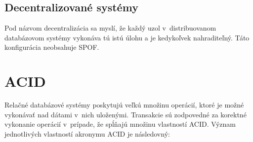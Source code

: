 \documentclass[11pt,twoside,a4paper]{book}
\begin{document}
\subsection*{Decentralizované systémy}

Pod názvom decentralizácia sa myslí, že každý uzol v~distribuovanom databázovom systémy vykonáva tú istú úlohu a je kedykoľvek nahraditeľný. Táto konfigurácia neobsahuje SPOF.


\section{ACID}

Relačné databázové systémy poskytujú veľkú množinu operácií, ktoré je možné vykonávať nad dátami v~nich uloženými. Transakcie \cite{gray1981transaction, haerder1983principles} sú zodpovedné za korektné vykonanie operácií v~prípade, že spĺňajú množinu vlastností ACID. Význam jednotlivých vlastností akronymu ACID je následovný:
\end{document}
